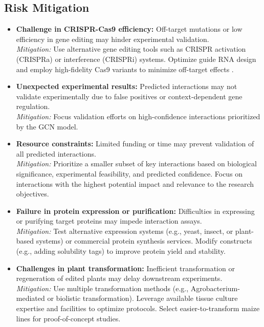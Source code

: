 \documentclass{article}
\begin{document}
\subsection{Risk Mitigation}

\begin{itemize}
    \item \textbf{Challenge in CRISPR-Cas9 efficiency:} 
    Off-target mutations or low efficiency in gene editing may hinder experimental validation. \\
    \textit{Mitigation:} Use alternative gene editing tools such as CRISPR activation (CRISPRa) or interference (CRISPRi) systems. Optimize guide RNA design and employ high-fidelity Cas9 variants to minimize off-target effects \cite{morelli2021crispr}. 
    
    \item \textbf{Unexpected experimental results:}
    Predicted interactions may not validate experimentally due to false positives or context-dependent gene regulation. \\
    \textit{Mitigation:} Focus validation efforts on high-confidence interactions prioritized by the GCN model.
    
    \item \textbf{Resource constraints:}
    Limited funding or time may prevent validation of all predicted interactions. \\
    \textit{Mitigation:} Prioritize a smaller subset of key interactions based on biological significance, experimental feasibility, and predicted confidence. Focus on interactions with the highest potential impact and relevance to the research objectives.
    
    \item \textbf{Failure in protein expression or purification:}
    Difficulties in expressing or purifying target proteins may impede interaction assays. \\
    \textit{Mitigation:} Test alternative expression systems (e.g., yeast, insect, or plant-based systems) or commercial protein synthesis services. Modify constructs (e.g., adding solubility tags) to improve protein yield and stability.
    
    \item \textbf{Challenges in plant transformation:}
    Inefficient transformation or regeneration of edited plants may delay downstream experiments. \\
    \textit{Mitigation:} Use multiple transformation methods (e.g., Agrobacterium-mediated or biolistic transformation). Leverage available tissue culture expertise and facilities to optimize protocols. Select easier-to-transform maize lines for proof-of-concept studies.
    

\end{itemize}
\end{document}
